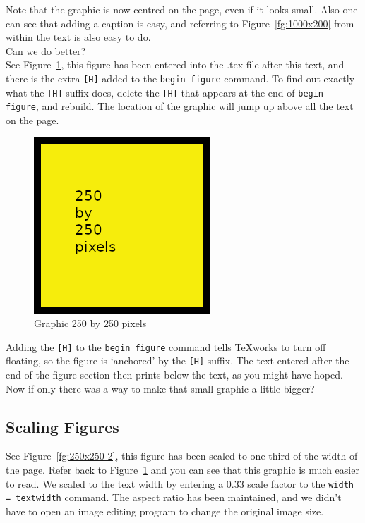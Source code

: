 Note that the graphic is now centred on the page, even if it looks small.  Also one can see that adding a caption is easy, and referring to Figure~\ref{fg:1000x200} from within the text is also easy to do.\\

Can we do better?\\

See Figure~\ref{fg:250x250}, this figure has been entered into the .tex file after this text, and there is the extra \texttt{[H]} added to the \texttt{begin figure} command. To find out exactly what the \texttt{[H]} suffix does, delete the \texttt{[H]} that appears at the end of \texttt{begin figure}, and rebuild.  The location of the graphic will jump up above all the text on the page.

\begin{figure}[H]
\centering
\includegraphics{250x250}
\caption{Graphic 250 by 250 pixels}\label{fg:250x250}
\end{figure}

Adding the \texttt{[H]} to the \texttt{begin figure} command tells TeXworks to turn off floating, so the figure is `anchored' by the \texttt{[H]} suffix.  The text entered after the end of the figure section then prints below the text, as you might have hoped.\\

Now if only there was a way to make that small graphic a little bigger?


\subsection*{Scaling Figures}

See Figure~\ref{fg:250x250-2}, this figure has been scaled to one third of the width of the page.  Refer back to Figure~\ref{fg:250x250} and you can see that this graphic is much easier to read.  We scaled to the text width by entering a 0.33 scale factor to the \texttt{width =  textwidth} command. The aspect ratio has been maintained, and we didn't have to open an image editing program to change the original image size.\\

